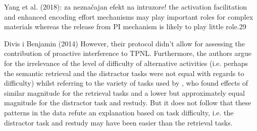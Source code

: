 \documentclass[../main.tex]{subfiles}
\begin{document}
Yang et al. (2018): za neznačajan efekt na intruzore!
the activation facilitation and enhanced encoding effort mechanisms may play
important roles for complex materials whereas the release from PI
mechanism is likely to play little role.29


Divis i Benjamin (2014)
However, their protocol didn't allow for assessing the contribution of proactive interference to TPNL. Furthermore, the authors argue for the irrelevance of the level of difficulty of alternative activities (i.e. perhaps the semantic retrieval and the distractor tasks were not equal with regards to difficulty) whilst referring to the variety of tasks used by \cite{pastotterRetrievalLearningFacilitates2011}, who found effects of similar magnitude for the retrieval tasks and a lower but approximately equal magnitude for the distractor task and restudy. But it does not follow that these patterns in the data refute an explanation based on task difficulty, i.e. the distractor task and restudy may have been easier than the retrieval tasks. 

{
	\biblio
}
\end{document}
